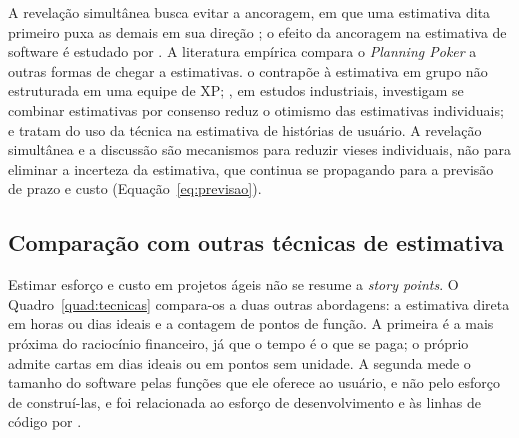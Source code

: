 A revelação simultânea busca evitar a ancoragem, em que uma estimativa dita
primeiro puxa as demais em sua direção \cite{mountaingoatpoker}; o efeito da
ancoragem na estimativa de software é estudado por . A
literatura empírica compara o \textit{Planning Poker} a outras formas de chegar
a estimativas.  o contrapõe à estimativa em grupo não
estruturada em uma equipe de XP; , em estudos
industriais, investigam se combinar estimativas por consenso reduz o otimismo
das estimativas individuais; e  tratam do uso da técnica
na estimativa de histórias de usuário. A revelação simultânea e a discussão são
mecanismos para reduzir vieses individuais, não para eliminar a incerteza da
estimativa, que continua se propagando para a previsão de prazo e custo
(Equação~\ref{eq:previsao}).

\subsection{Comparação com outras técnicas de estimativa}
\label{sub:comparacao}

Estimar esforço e custo em projetos ágeis não se resume a \textit{story
points}. O Quadro~\ref{quad:tecnicas} compara-os a duas outras abordagens: a
estimativa direta em horas ou dias ideais e a contagem de pontos de função. A
primeira é a mais próxima do raciocínio financeiro, já que o tempo é o que se
paga; o próprio  admite cartas em dias ideais ou em
pontos sem unidade. A segunda mede o tamanho do software pelas funções que ele
oferece ao usuário, e não pelo esforço de construí-las, e foi relacionada ao
esforço de desenvolvimento e às linhas de código por .

